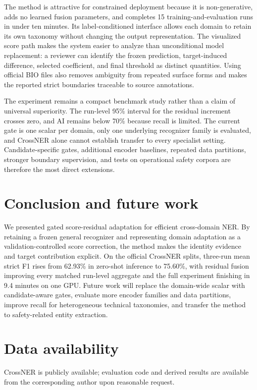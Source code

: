 \documentclass[a4paper,fleqn,numbers,doubleblind]{cas-dc}
\begin{document}
The method is attractive for constrained deployment because it is non-generative, adds no learned fusion parameters, and completes 15 training-and-evaluation runs in under ten minutes. Its label-conditioned interface allows each domain to retain its own taxonomy without changing the output representation. The visualized score path makes the system easier to analyze than unconditional model replacement: a reviewer can identify the frozen prediction, target-induced difference, selected coefficient, and final threshold as distinct quantities. Using official BIO files also removes ambiguity from repeated surface forms and makes the reported strict boundaries traceable to source annotations.

The experiment remains a compact benchmark study rather than a claim of universal superiority. The run-level 95\% interval for the residual increment crosses zero, and AI remains below 70\% because recall is limited. The current gate is one scalar per domain, only one underlying recognizer family is evaluated, and CrossNER alone cannot establish transfer to every specialist setting. Candidate-specific gates, additional encoder baselines, repeated data partitions, stronger boundary supervision, and tests on operational safety corpora are therefore the most direct extensions.

\section{Conclusion and future work}
We presented gated score-residual adaptation for efficient cross-domain NER. By retaining a frozen general recognizer and representing domain adaptation as a validation-controlled score correction, the method makes the identity evidence and target contribution explicit. On the official CrossNER splits, three-run mean strict F1 rises from 62.93\% in zero-shot inference to 75.60\%, with residual fusion improving every matched run-level aggregate and the full experiment finishing in 9.4 minutes on one GPU. Future work will replace the domain-wide scalar with candidate-aware gates, evaluate more encoder families and data partitions, improve recall for heterogeneous technical taxonomies, and transfer the method to safety-related entity extraction.

\section*{Data availability}
CrossNER is publicly available; evaluation code and derived results are available from the corresponding author upon reasonable request.
\end{document}
